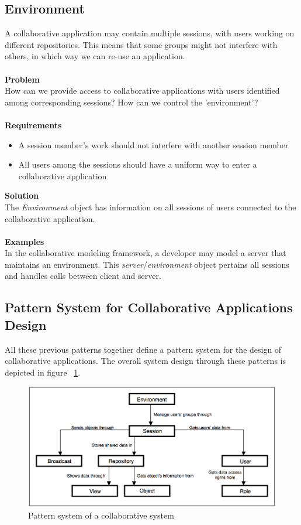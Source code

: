 \subsection{Environment}

A collaborative application may contain multiple sessions, with users working on different repositories. This means that some groups might not interfere with others, in which way we can re-use an application.
\\ \\
\textbf{Problem}
\\
How can we provide access to collaborative applications with users identified among corresponding sessions? How can we control the 'environment'?
\\ \\
\textbf{Requirements}
\begin{itemize}
\item{A session member's work should not interfere with another session member}
\item{All users among the sessions should have a uniform way to enter a collaborative application}
\end{itemize}
\textbf{Solution}
\\
The \textit{Environment} object has information on all sessions of users connected to the collaborative application.
\\ \\
\textbf{Examples}
\\
In the collaborative modeling framework, a developer may model a server that maintains an environment. This \textit{server}/\textit{environment} object pertains all sessions and handles calls between client and server.

\subsection{Pattern System for Collaborative Applications Design}

All these previous patterns together define a pattern system for the design of collaborative applications. The overall system design through these patterns is depicted in figure ~\ref{fig:pattern_system}.

\begin{figure}[h!]
\centering
\includegraphics[width=1.0\textwidth]{images/chap5_pattern_system.png}
\caption{Pattern system of a collaborative system}
\label{fig:pattern_system}
\end{figure}

